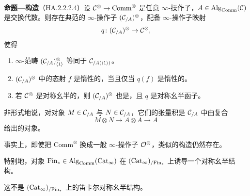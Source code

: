 \nitem\label{L26-1.5}\textbf{命题—构造}（HA.2.2.2.4）\quad 设 $\mathcal{C}^{\otimes}\to\mathrm{Comm}^{\otimes}$ 是任意 $\infty$-操作子，$A\in\operatorname{Alg}_{\mathrm{Comm}}(\mathcal{C})$ 是交换代数。则存在典范的 $\infty$-操作子 $(\mathcal{C}_{/A})^{\otimes}$，配备 $\infty$-操作子映射
\[
q\colon(\mathcal{C}_{/A})^{\otimes}\to\mathcal{C}^{\otimes},
\]
使得
\begin{enumerate}[label=(\arabic*),leftmargin=2.4em,itemsep=0.1em]
\item $\infty$-范畴 $(\mathcal{C}_{/A})^{\otimes}_{\langle1\rangle}$ 等同于 $\mathcal{C}_{/A(\langle1\rangle)}$。
\item $(\mathcal{C}_{/A})^{\otimes}$ 中的态射 $f$ 是惰性的，当且仅当 $q(f)$ 是惰性的。
\item 若 $\mathcal{C}^{\otimes}$ 是对称幺半的，则 $(\mathcal{C}_{/A})^{\otimes}$ 也是，且 $q$ 是对称幺半函子。
\end{enumerate}

\begin{remark}\label{L26-1.6}
非形式地说，对对象 $M\in\mathcal{C}_{/A}$ 与 $N\in\mathcal{C}_{/A}$，它们的张量积是 $\mathcal{C}_{/A}$ 中由复合
\[
M\otimes N\to A\otimes A\to A
\]
给出的对象。
\end{remark}

\begin{remark}\label{L26-1.7}
事实上，即使把 $\mathrm{Comm}^{\otimes}$ 换成一般 $\infty$-操作子 $\mathcal{O}^{\otimes}$，类似的构造仍然存在。
\end{remark}

\nitem\label{L26-1.8} 特别地，对象 $\mathrm{Fin}_{*}\in\operatorname{Alg}_{\mathrm{Comm}}(\operatorname{Cat}_{\infty})$ 在 $(\operatorname{Cat}_{\infty})_{/\mathrm{Fin}_{*}}$ 上诱导一个对称幺半结构。

\begin{warning}\label{L26-1.9}
这不是 $(\operatorname{Cat}_{\infty})_{/\mathrm{Fin}_{*}}$ 上的笛卡尔对称幺半结构。
\end{warning}


